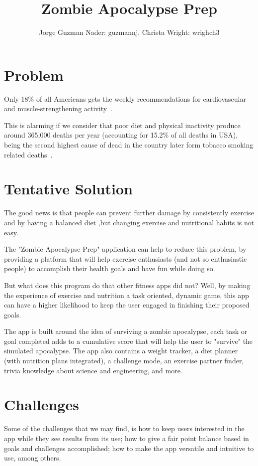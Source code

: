 \documentclass[12pt]{article}
\title{Zombie Apocalypse Prep}
\author{Jorge Guzman Nader: guzmannj, Christa Wright: wrighch3}
\begin{document}
\maketitle
\tableofcontents



\section{Problem}
Only 18\% of all Americans gets the weekly recommendations for cardiovascular and muscle-strengthening activity~\cite{Harvard}. 

This is alarming if we consider that poor diet and physical inactivity produce around 365,000 deaths per year (accounting for 15.2\% of all deaths in USA), being the second highest cause of dead in the country later form tobacco smoking related deaths~\cite{Mokdad}.

\section{Tentative Solution}
The good news is that people can prevent further damage by consistently exercise and by having a  balanced diet ,but changing exercise and nutritional habits is not easy.

The "Zombie Apocalypse Prep" application can help to reduce this problem, by providing a platform that will help exercise enthusiasts (and not so enthusiastic people) to accomplish their health goals and have fun while doing so. 

But what does this program do that other fitness apps did not? Well, by making the experience of exercise and nutrition a task oriented, dynamic  game, this app can have a higher likelihood to keep the user engaged in finishing their proposed goals. 

The app is built around the idea of surviving a zombie apocalypse, each task or goal completed adds to a cumulative score that will help the user to "survive" the simulated apocalypse. 
The app also contains a weight tracker, a diet planner (with nutrition plans integrated), a challenge mode, an exercise partner finder, trivia knowledge about science and engineering, and more.


\section{Challenges}
Some of the challenges that we may find, is how to keep users interested in the app while they see results from its use; how to give a fair point balance based in goals and challenges accomplished; how to make the app versatile and intuitive to use, among others.
\end{document}
